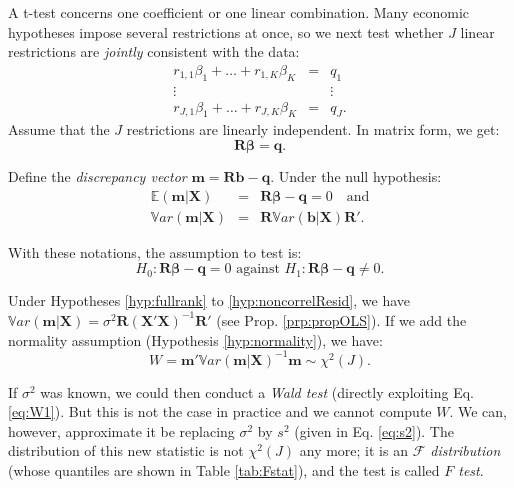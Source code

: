\documentclass[
  11pt,
]{book}
\theoremstyle{definition}
\theoremstyle{definition}
\theoremstyle{definition}
\theoremstyle{definition}
\theoremstyle{remark}
\begin{document}
A t-test concerns one coefficient or one linear combination. Many economic hypotheses impose several restrictions at once, so we next test whether \(J\) linear restrictions are \emph{jointly} consistent with the data:
\begin{equation}\label{eq:restrictions}
\begin{array}{ccc}
r_{1,1} \beta_1 + \dots + r_{1,K} \beta_K &=& q_1\\
\vdots && \vdots\\
r_{J,1} \beta_1 + \dots + r_{J,K} \beta_K &=& q_J.
\end{array}
\end{equation}
Assume that the \(J\) restrictions are linearly independent. In matrix form, we get:
\begin{equation}
\mathbf{R}\boldsymbol\beta = \mathbf{q}.
\end{equation}

Define the \emph{discrepancy vector} \(\mathbf{m} = \mathbf{R}\mathbf{b} - \mathbf{q}\). Under the null hypothesis:
\begin{eqnarray*}
\mathbb{E}(\mathbf{m}|\mathbf{X}) &=& \mathbf{R}\boldsymbol\beta - \mathbf{q} = 0 \quad \mbox{and} \\
\mathbb{V}ar(\mathbf{m}|\mathbf{X}) &=& \mathbf{R} \mathbb{V}ar(\mathbf{b}|\mathbf{X}) \mathbf{R}'.
\end{eqnarray*}

With these notations, the assumption to test is:
\begin{equation}
\boxed{H_0: \mathbf{R}\boldsymbol\beta - \mathbf{q} = 0 \mbox{ against } H_1: \mathbf{R}\boldsymbol\beta - \mathbf{q} \ne 0.}\label{eq:H0Ftest}
\end{equation}

Under Hypotheses \ref{hyp:fullrank} to \ref{hyp:noncorrelResid}, we have \(\mathbb{V}ar(\mathbf{m}|\mathbf{X}) = \sigma^2 \mathbf{R} (\mathbf{X}'\mathbf{X})^{-1} \mathbf{R}'\) (see Prop. \ref{prp:propOLS}). If we add the normality assumption (Hypothesis \ref{hyp:normality}), we have:
\begin{equation}
W = \mathbf{m}'\mathbb{V}ar(\mathbf{m}|\mathbf{X})^{-1}\mathbf{m} \sim \chi^2(J). \label{eq:W1}
\end{equation}

If \(\sigma^2\) was known, we could then conduct a \emph{Wald test} (directly exploiting Eq. \eqref{eq:W1}). But this is not the case in practice and we cannot compute \(W\). We can, however, approximate it be replacing \(\sigma^2\) by \(s^2\) (given in Eq. \eqref{eq:s2}). The distribution of this new statistic is not \(\chi^2(J)\) any more; it is an \emph{\(\mathcal{F}\) distribution} (whose quantiles are shown in Table \ref{tab:Fstat}), and the test is called \emph{\(F\) test}.
\end{document}
